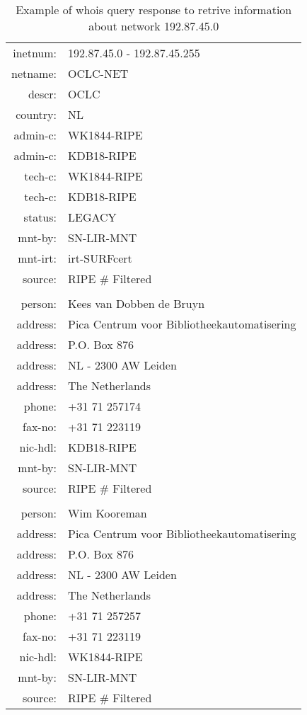 \documentclass[11pt,a4paper]{scrreprt}
\begin{document}
\begin{table}[!h]
\centering
\begin{tabular}{  r  l  }
 
 inetnum:  & 	192.87.45.0 - 192.87.45.255 \\
 netname:  & 	OCLC-NET \\
 descr:    &	OCLC \\
 country:  & 	NL \\
 admin-c:  & 	WK1844-RIPE \\
 admin-c:  & 	KDB18-RIPE \\
 tech-c:   & 	WK1844-RIPE \\
 tech-c:   & 	KDB18-RIPE \\
 status:   & 	LEGACY \\
 mnt-by:   & 	SN-LIR-MNT \\
 mnt-irt:  & 	irt-SURFcert \\
 source:   & 	RIPE \# Filtered \\
 \\
 person:   & 	Kees van Dobben de Bruyn \\
 address:  & 	Pica Centrum voor Bibliotheekautomatisering \\
 address:  & 	P.O. Box 876 \\
 address:  & 	NL - 2300 AW Leiden \\
 address:  & 	The Netherlands \\
 phone:    & 	+31 71 257174 \\
 fax-no:   & 	+31 71 223119 \\
 nic-hdl:  & 	KDB18-RIPE \\
 mnt-by:   &  	SN-LIR-MNT   \\
 source:   & 	RIPE \# Filtered \\
 \\
 person:   &    Wim Kooreman\\
 address:  &    Pica Centrum voor Bibliotheekautomatisering\\
 address:  &    P.O. Box 876\\
 address:  &    NL - 2300 AW Leiden\\
 address:  &    The Netherlands\\
 phone:    &    +31 71 257257\\
 fax-no:   &    +31 71 223119\\
 nic-hdl:  &    WK1844-RIPE\\
 mnt-by:   &    SN-LIR-MNT\\
 source:   &    RIPE \# Filtered\\
 
\end{tabular}
\caption{Example of whois query response to retrive information about network 192.87.45.0}
\label{table:2}
\end{table}     
        
\end{document}
